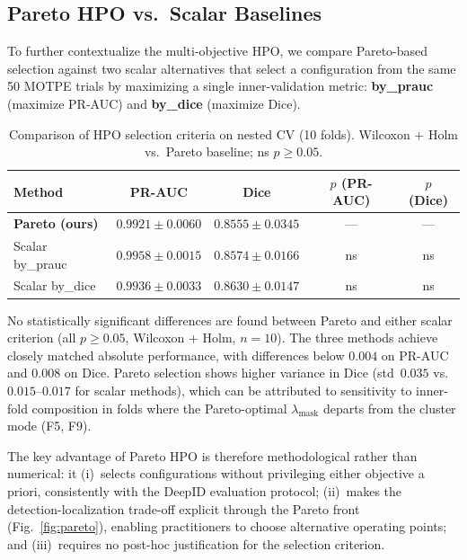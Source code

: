 \subsection{Pareto HPO vs.\ Scalar Baselines}
\label{subsec:scalar}

To further contextualize the multi-objective HPO, we compare Pareto-based
selection against two scalar alternatives that select a configuration from the
same 50 MOTPE trials by maximizing a single inner-validation metric:
\textbf{by\_prauc} (maximize PR-AUC) and \textbf{by\_dice} (maximize Dice).

\begin{table}[!t]
  \centering
  \caption{Comparison of HPO selection criteria on nested CV (10 folds).
           Wilcoxon + Holm vs.\ Pareto baseline; ns $p \geq 0.05$.}
  \label{tab:scalar}
  \begin{tabular}{lcccc}
    \toprule
    Method & PR-AUC & Dice & $p$ (PR-AUC) & $p$ (Dice) \\
    \midrule
    \textbf{Pareto (ours)} & $0.9921 \pm 0.0060$ & $0.8555 \pm 0.0345$ & — & — \\
    Scalar by\_prauc & $0.9958 \pm 0.0015$ & $0.8574 \pm 0.0166$ & ns & ns \\
    Scalar by\_dice  & $0.9936 \pm 0.0033$ & $0.8630 \pm 0.0147$ & ns & ns \\
    \bottomrule
  \end{tabular}
\end{table}

No statistically significant differences are found between Pareto and either scalar
criterion (all $p \geq 0.05$, Wilcoxon + Holm, $n = 10$). The three methods
achieve closely matched absolute performance, with differences below $0.004$ on
PR-AUC and $0.008$ on Dice. Pareto selection shows higher variance in Dice
(std~$0.035$ vs.\ $0.015$--$0.017$ for scalar methods), which can be attributed to
sensitivity to inner-fold composition in folds where the Pareto-optimal
$\lambda_{\text{mask}}$ departs from the cluster mode (F5, F9).

The key advantage of Pareto HPO is therefore methodological rather than numerical:
it (i)~selects configurations without privileging either objective a priori,
consistently with the DeepID evaluation protocol; (ii)~makes the detection-localization
trade-off explicit through the Pareto front (Fig.~\ref{fig:pareto}), enabling
practitioners to choose alternative operating points; and (iii)~requires no
post-hoc justification for the selection criterion.

